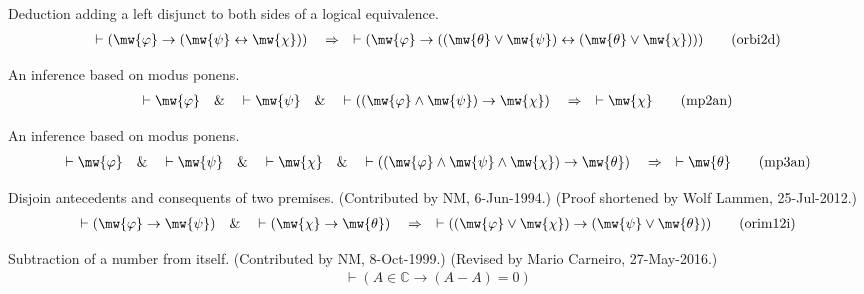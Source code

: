 \begin{lemma} Deduction adding a left disjunct to both
sides of a logical equivalence.
\begin{align}
\vdash ( \mw{\varphi} \rightarrow ( \mw{\psi} \leftrightarrow \mw{\chi} )
    )\quad\Rightarrow\quad \vdash ( \mw{\varphi} \rightarrow ( ( \mw{\theta}
    \vee \mw{\psi} ) \leftrightarrow ( \mw{\theta} \vee \mw{\chi} ) )
    )\label{eq:orbi2d}\tag{orbi2d}
\end{align}
\end{lemma}


\begin{lemma} An inference based on modus ponens. 
\begin{align}
\vdash \mw{\varphi}\quad\&\quad \vdash \mw{\psi}\quad\&\quad \vdash ( (
    \mw{\varphi} \wedge \mw{\psi} ) \rightarrow \mw{\chi}
    )\quad\Rightarrow\quad \vdash \mw{\chi}\label{eq:mp2an}\tag{mp2an}
\end{align}
\end{lemma}


\begin{lemma} An inference based on modus ponens. 
\begin{align}
\vdash \mw{\varphi}\quad\&\quad \vdash \mw{\psi}\quad\&\quad \vdash
    \mw{\chi}\quad\&\quad \vdash ( ( \mw{\varphi} \wedge \mw{\psi} \wedge
    \mw{\chi} ) \rightarrow \mw{\theta} )\quad\Rightarrow\quad \vdash
    \mw{\theta}\label{eq:mp3an}\tag{mp3an}
\end{align}
\end{lemma}


\begin{lemma} Disjoin antecedents and consequents of two
premises.  (Contributed by
       NM, 6-Jun-1994.)  (Proof shortened by Wolf Lammen, 25-Jul-2012.)
\begin{align}
\vdash ( \mw{\varphi} \rightarrow \mw{\psi} )\quad\&\quad \vdash ( \mw{\chi}
    \rightarrow \mw{\theta} )\quad\Rightarrow\quad \vdash ( ( \mw{\varphi} \vee
    \mw{\chi} ) \rightarrow ( \mw{\psi} \vee \mw{\theta} )
    )\label{eq:orim12i}\tag{orim12i}
\end{align}
\end{lemma}


\begin{lemma} Subtraction of a number from itself. 
(Contributed by NM, 8-Oct-1999.)
     (Revised by Mario Carneiro, 27-May-2016.)
\begin{align}
\vdash ( A \in \mathbb{C} \rightarrow ( A \minus A ) = 0
    )\label{eq:subid}\tag{subid}
\end{align}
\end{lemma}


